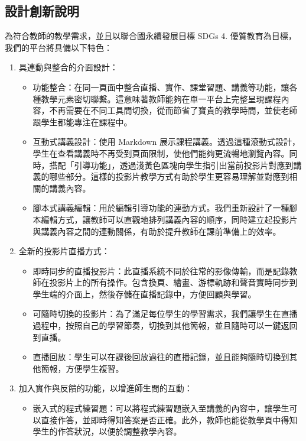 \documentclass[12pt]{article}
\begin{document}
\subsection{設計創新說明}
為符合教師的教學需求，並且以聯合國永續發展目標 SDGs 4. 優質教育為目標，我們的平台將具備以下特色：
\begin{enumerate}[label=(\arabic*)]
  \item 具連動與整合的介面設計：
  \begin{itemize}
    \item 功能整合：在同一頁面中整合直播、實作、課堂習題、講義等功能，讓各種教學元素密切聯繫。這意味著教師能夠在單一平台上完整呈現課程內容，不再需要在不同工具間切換，從而節省了寶貴的教學時間，並使老師跟學生都能專注在課程中。
    \item 互動式講義設計：使用 Markdown 展示課程講義。透過這種滾動式設計，學生在查看講義時不再受到頁面限制，使他們能夠更流暢地瀏覽內容。同時，搭配「引導功能」，透過淺黃色區塊向學生指引出當前投影片對應到講義的哪些部分。這樣的投影片教學方式有助於學生更容易理解並對應到相關的講義內容。\
    \item 腳本式講義編輯：用於編輯引導功能的連動方式。我們重新設計了一種腳本編輯方式，讓教師可以直觀地排列講義內容的順序，同時建立起投影片與講義內容之間的連動關係，有助於提升教師在課前準備上的效率。
  \end{itemize}
  \item 全新的投影片直播方式：
  \begin{itemize}
    \item 即時同步的直播投影片：此直播系統不同於往常的影像傳輸，而是記錄教師在投影片上的所有操作。包含換頁、繪畫、游標軌跡和聲音實時同步到學生端的介面上，然後存儲在直播記錄中，方便回顧與學習。
    \item 可隨時切換的投影片：為了滿足每位學生的學習需求，我們讓學生在直播過程中，按照自己的學習節奏，切換到其他簡報，並且隨時可以一鍵返回到直播。
    \item 直播回放：學生可以在課後回放過往的直播記錄，並且能夠隨時切換到其他簡報，方便學生複習。
  \end{itemize}
  \item 加入實作與反饋的功能，以增進師生間的互動：
  \begin{itemize}
    \item 嵌入式的程式練習題：可以將程式練習題嵌入至講義的內容中，讓學生可以直接作答，並即時得知答案是否正確。此外，教師也能從教學頁中得知學生的作答狀況，以便於調整教學內容。
      

\end{itemize}
\end{enumerate}
\end{document}
